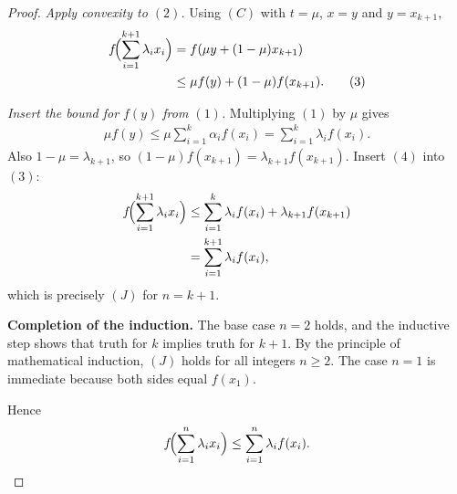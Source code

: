 \begin{proof}
\emph{Apply convexity to \((2)\).}  
Using \((C)\) with \(t=\mu\), \(x=y\) and \(y=x_{k+1}\),
\begin{align}
f\!\Bigl(\sum_{i=1}^{k+1}\lambda_{i}x_{i}\Bigr)
&=f(\mu y+(1-\mu)x_{k+1}) \\
&\le \mu f(y)+(1-\mu)f(x_{k+1}). \tag{3}
\end{align}

\emph{Insert the bound for \(f(y)\) from \((1)\).}  
Multiplying \((1)\) by \(\mu\) gives
\begin{align}
\mu f(y) \le \mu\sum_{i=1}^{k}\alpha_{i}f(x_{i})
= \sum_{i=1}^{k}\lambda_{i}f(x_{i}). \tag{4}
\end{align}
Also \(1-\mu=\lambda_{k+1}\), so \((1-\mu)f(x_{k+1})=\lambda_{k+1}f(x_{k+1})\).  
Insert \((4)\) into \((3)\):
\begin{align}
f\!\Bigl(\sum_{i=1}^{k+1}\lambda_{i}x_{i}\Bigr)
&\le \sum_{i=1}^{k}\lambda_{i}f(x_{i})+\lambda_{k+1}f(x_{k+1}) \\
&= \sum_{i=1}^{k+1}\lambda_{i}f(x_{i}),
\end{align}
which is precisely \((J)\) for \(n=k+1\).

\medskip\noindent\textbf{Completion of the induction.}  
The base case \(n=2\) holds, and the inductive step shows that truth for \(k\) implies truth for \(k+1\). By the principle of mathematical induction, \((J)\) holds for all integers \(n\ge2\). The case \(n=1\) is immediate because both sides equal \(f(x_{1})\).

Hence
\[
f\!\Bigl(\sum_{i=1}^{n}\lambda_{i}x_{i}\Bigr)\le\sum_{i=1}^{n}\lambda_{i}f(x_{i}).
\]
\end{proof}